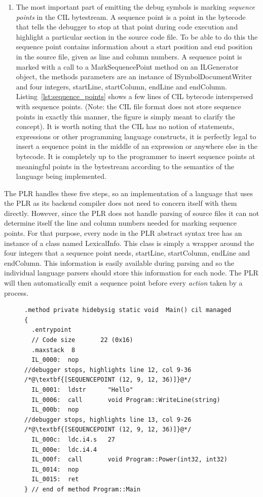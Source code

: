 \begin{enumerate}
		\item The most important part of emitting the debug symbols is marking 
		\textit{sequence points} in the CIL bytestream. A sequence point is a 
		point in the bytecode that tells the debugger to stop at that point during 
		code execution and highlight a particular section in the source code file. 
		To be able to do this the sequence point contains information about a 
		start position and end position in the source file, given as line and 
		column numbers. A sequence point is marked with a call to a 
		\textsf{MarkSequencePoint} method on an \textsf{ILGenerator} object, the 
		methods parameters are an instance of \textsf{ISymbolDocumentWriter} and 
		four integers, startLine, startColumn, endLine and endColumn. 
		Listing~\ref{lst:sequence_points} shows a few lines of CIL bytecode 
		interspersed with sequence points. (Note: the CIL file format does not 
		store sequence points in exactly this manner, the figure is simply meant 
		to clarify the concept). It is worth noting that the CIL has no notion of 
		statements, expressions or other programming language constructs, it is 
		perfectly legal to insert a sequence point in the middle of an expression
		or anywhere else in the bytecode. It is completely up to the programmer to
		insert sequence points at meaningful points in the bytestream according to
		the semantics of the language being implemented.
		
 	\end{enumerate}
 	
 	The PLR handles these five steps, so an implementation of a language that 
 	uses the PLR as its backend compiler does not need to concern itself with 
 	them directly. However, since the PLR does not handle parsing of source 
 	files it can not determine itself the line and column numbers needed for 
 	marking sequence points. For that purpose, every node in the PLR abstract 
 	syntax tree has an instance of a class named \textsf{LexicalInfo}. This 
 	class is simply a wrapper around the four integers that a sequence point 
 	needs, startLine, startColumn, endLine and endColumn. This information is 
 	easily available during parsing and so the individual language parsers 
 	should store this information for each node. The PLR will then automatically 
 	emit a sequence point before every \textit{action} taken by a process.

	\begin{figure}
	\begin{lstlisting}[caption=CIL bytecode with sequence points, label=lst:sequence_points] 
.method private hidebysig static void  Main() cil managed
{
  .entrypoint
  // Code size       22 (0x16)
  .maxstack  8
  IL_0000:  nop
//debugger stops, highlights line 12, col 9-36
/*@\textbf{[SEQUENCEPOINT (12, 9, 12, 36)]}@*/
  IL_0001:  ldstr      "Hello"
  IL_0006:  call       void Program::WriteLine(string)
  IL_000b:  nop
//debugger stops, highlights line 13, col 9-26
/*@\textbf{[SEQUENCEPOINT (12, 9, 12, 36)]}@*/
  IL_000c:  ldc.i4.s   27
  IL_000e:  ldc.i4.4
  IL_000f:  call       void Program::Power(int32, int32)
  IL_0014:  nop
  IL_0015:  ret
} // end of method Program::Main
  \end{lstlisting}
	\end{figure}
	
